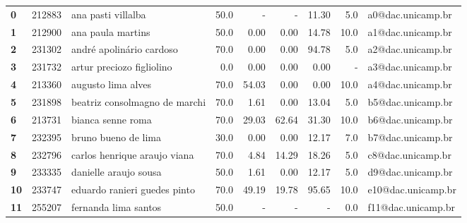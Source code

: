 \documentclass[11pt]{article}
\begin{document}
\begin{center}
\begin{landscape}
\begin{longtable}{lllrrrrrl}
\bottomrule
\endlastfoot
\textbf{0     } &  212883 &                    ana pasti villalba &                  50.0 &           - &           - &       11.30 &                      5.0 &   a0@dac.unicamp.br \\
\textbf{1     } &  212900 &                     ana paula martins &                  50.0 &        0.00 &        0.00 &       14.78 &                     10.0 &   a1@dac.unicamp.br \\
\textbf{2     } &  231302 &              andré apolinário cardoso &                  70.0 &        0.00 &        0.00 &       94.78 &                      5.0 &   a2@dac.unicamp.br \\
\textbf{3     } &  231732 &             artur preciozo figliolino &                   0.0 &        0.00 &        0.00 &        0.00 &                        - &   a3@dac.unicamp.br \\
\textbf{4     } &  213360 &                    augusto lima alves &                  70.0 &       54.03 &        0.00 &        0.00 &                     10.0 &   a4@dac.unicamp.br \\
\textbf{5     } &  231898 &         beatriz consolmagno de marchi &                  70.0 &        1.61 &        0.00 &       13.04 &                      5.0 &   b5@dac.unicamp.br \\
\textbf{6     } &  213731 &                     bianca senne roma &                  70.0 &       29.03 &       62.64 &       31.30 &                     10.0 &   b6@dac.unicamp.br \\
\textbf{7     } &  232395 &                   bruno bueno de lima &                  30.0 &        0.00 &        0.00 &       12.17 &                      7.0 &   b7@dac.unicamp.br \\
\textbf{8     } &  232796 &          carlos henrique araujo viana &                  70.0 &        4.84 &       14.29 &       18.26 &                      5.0 &   c8@dac.unicamp.br \\
\textbf{9     } &  233335 &                 danielle araujo sousa &                  50.0 &        1.61 &        0.00 &       12.17 &                      5.0 &   d9@dac.unicamp.br \\
\textbf{10    } &  233747 &          eduardo ranieri guedes pinto &                  70.0 &       49.19 &       19.78 &       95.65 &                     10.0 &  e10@dac.unicamp.br \\
\textbf{11    } &  255207 &                  fernanda lima santos &                  50.0 &           - &           - &           - &                      0.0 &  f11@dac.unicamp.br \\

\end{longtable}
\end{landscape}
\end{center}
\end{document}
